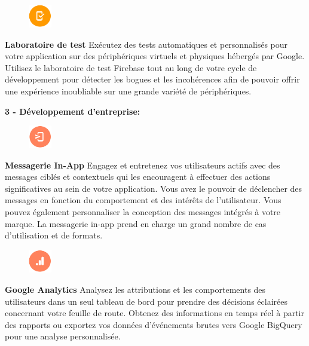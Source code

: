 \begin{figure}
	\includegraphics[width=1cm]{Images/chapter2/firebase_services/test_lab.png}
\end{figure}
\textbf{Laboratoire de test} Exécutez des tests automatiques et personnalisés pour votre application sur des périphériques virtuels et physiques hébergés par Google. Utilisez le laboratoire de test Firebase tout au long de votre cycle de développement pour détecter les bogues et les incohérences afin de pouvoir offrir une expérience inoubliable sur une grande variété de périphériques.\bigskip

\longtab \textbf{3 - Développement d'entreprise:}\bigskip

\begin{figure}
	\includegraphics[width=1cm]{Images/chapter2/firebase_services/in-app_messaging.png}
\end{figure}
\textbf{Messagerie In-App} Engagez et entretenez vos utilisateurs actifs avec des messages ciblés et contextuels qui les encouragent à effectuer des actions significatives au sein de votre application. Vous avez le pouvoir de déclencher des messages en fonction du comportement et des intérêts de l'utilisateur. Vous pouvez également personnaliser la conception des messages intégrés à votre marque. La messagerie in-app prend en charge un grand nombre de cas d'utilisation et de formats.\medskip

\begin{figure}
	\includegraphics[width=1cm]{Images/chapter2/firebase_services/google_analytics.png}
\end{figure}
\textbf{Google Analytics} Analysez les attributions et les comportements des utilisateurs dans un seul tableau de bord pour prendre des décisions éclairées concernant votre feuille de route. Obtenez des informations en temps réel à partir des rapports ou exportez vos données d'événements brutes vers Google BigQuery pour une analyse personnalisée.\medskip

